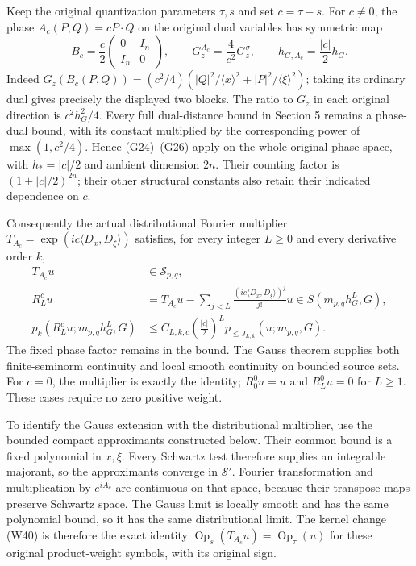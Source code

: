 \documentclass[
  11pt,
]{article}
\begin{document}
Keep the original quantization parameters \(\tau,s\) and set
\(c=\tau-s\). For \(c\ne0\), the phase \(A_c(P,Q)=cP\cdot Q\) on the
original dual variables has symmetric map \[
 B_c=\frac c2\begin{pmatrix}0&I_n\\I_n&0\end{pmatrix},
 \qquad
 G_z^{A_c}=\frac4{c^2}G_z^\sigma,\qquad
 h_{G,A_c}=\frac{|c|}{2}h_G.
 \tag{RS3}
\] Indeed \(G_z(B_c(P,Q))=(c^2/4)(|Q|^2/\langle x\rangle^2+
|P|^2/\langle\xi\rangle^2)\); taking its ordinary dual gives precisely
the displayed two blocks. The ratio to \(G_z\) in each original
direction is \(c^2h_G^2/4\). Every full dual-distance bound in Section 5
remains a phase-dual bound, with its constant multiplied by the
corresponding power of \(\max(1,c^2/4)\). Hence (G24)--(G26) apply on
the whole original phase space, with \(h_*=|c|/2\) and ambient dimension
\(2n\). Their counting factor is \((1+|c|/2)^{2n}\); their other
structural constants also retain their indicated dependence on \(c\).

Consequently the actual distributional Fourier multiplier
\(T_{A_c}=\exp(ic\langle D_x,D_\xi\rangle)\) satisfies, for every
integer \(L\geq0\) and every derivative order \(k\), \[
 \begin{split}
 T_{A_c}u&\in\mathcal S_{p,q},\\
 R_L^cu&=T_{A_c}u-
       \sum_{j<L}\frac{(ic\langle D_x,D_\xi\rangle)^j}{j!}u
       \in S(m_{p,q}h_G^L,G),\\
 p_k(R_L^cu;m_{p,q}h_G^L,G)
 &\leq C_{L,k,c}\left(\frac{|c|}{2}\right)^L
             p_{\leq J_{L,k}}(u;m_{p,q},G).
 \end{split}
 \tag{RS4}
\] The fixed phase factor remains in the bound. The Gauss theorem
supplies both finite-seminorm continuity and local smooth continuity on
bounded source sets. For \(c=0\), the multiplier is exactly the
identity; \(R_0^0u=u\) and \(R_L^0u=0\) for \(L\geq1\). These cases
require no zero positive weight.

To identify the Gauss extension with the distributional multiplier, use
the bounded compact approximants constructed below. Their common bound
is a fixed polynomial in \(x,\xi\). Every Schwartz test therefore
supplies an integrable majorant, so the approximants converge in
\(\mathcal S'\). Fourier transformation and multiplication by
\(e^{iA_c}\) are continuous on that space, because their transpose maps
preserve Schwartz space. The Gauss limit is locally smooth and has the
same polynomial bound, so it has the same distributional limit. The
kernel change (W40) is therefore the exact identity
\(\operatorname{Op}_s(T_{A_c}u)=\operatorname{Op}_\tau(u)\) for these
original product-weight symbols, with its original sign.
\end{document}

